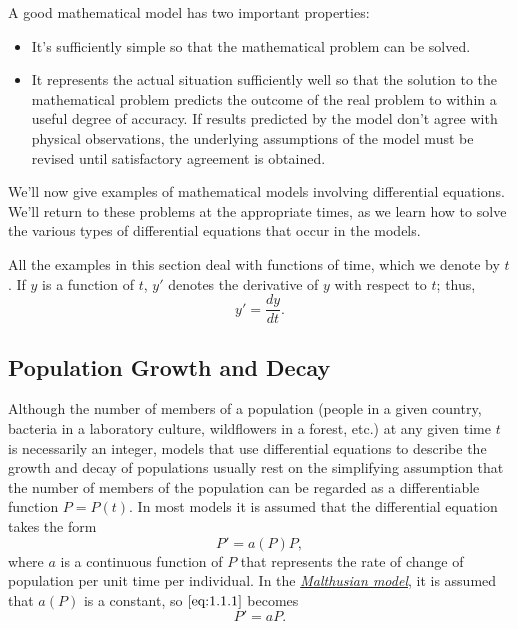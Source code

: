 \documentclass{ximera}
\begin{document}
A good mathematical model has two important properties:
 
\begin{itemize}
\item It's sufficiently simple so that the mathematical problem
can be solved.
 
\item It represents the actual situation sufficiently well so that the
solution to the mathematical problem predicts the outcome of the real
problem to within a useful degree of accuracy. If results predicted by
the model don't agree with physical observations, the
underlying
assumptions of the model must be revised until satisfactory agreement
is obtained.
\end{itemize}
 
We'll  now give  examples of mathematical models involving
differential equations. We'll return to these problems at the
appropriate times, as we learn how to solve the various types of
differential equations that occur in the models.
 
All the examples in this section deal with functions of time, which we
 denote by $t$. If $y$ is a function of $t$,  $y'$
denotes the derivative of $y$ with respect to $t$;   thus,
$$
y'=\frac{dy}{dt}.
$$
 
 
\subsection*{Population Growth and Decay}
 
Although the number of members of a population (people in a given
country, bacteria in a laboratory culture, wildflowers in a forest,
etc.)
at any given time $t$ is necessarily an integer, models that use
differential equations to describe the growth and decay of populations
usually rest on the simplifying assumption that the number of members of
the population can be regarded as a differentiable function $P=P(t)$.
In most models it is assumed that the differential equation takes the
form
\begin{equation} \label{eq:1.1.1}
P'=a(P)P,
\end{equation}
where $a$ is a continuous function of $P$ that represents the rate of
change of population per unit time per individual.
In the
\href{http://en.wikipedia.org/wiki/Thomas_Robert_Malthus}
{\textit{Malthusian model}},
 it is assumed that
$a(P)$ is a constant, so $\eqref{eq:1.1.1}$ becomes
\begin{equation} \label{eq:1.1.2}
P'=aP.
\end{equation}
 
\end{document}
